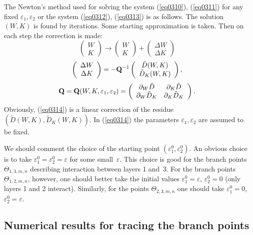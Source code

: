 \documentclass[12pt]{article}
\newcommand{\ptl}{\partial}
\newcommand{\eps}{\varepsilon}
\begin{document}
The Newton's method used for solving the system (\ref{eq0310}), (\ref{eq0311})
for any fixed $\eps_1 , \eps_2$
or the system (\ref{eq0312}), (\ref{eq0313}) is as follows. The solution $(W, K)$ is found
by iterations. 
Some starting approximation is taken.
Then on each step the correction is made:
\begin{equation}
\left( \begin{array}{c}
W\\
K
\end{array} \right) 
\to  
\left( \begin{array}{c}
W \\
K
\end{array} \right)
+
\left( \begin{array}{c}
\Delta W\\
\Delta K
\end{array} \right) 
\label{eq0314}
\end{equation} 
\begin{equation}
\left( \begin{array}{c}
\Delta W\\
\Delta K
\end{array} \right)
= 
-
{\bf Q}^{-1}
\left( \begin{array}{c}
\tilde D(W, K) \\
\tilde D_K(W, K)
\end{array} \right),
\label{eq0314}
\end{equation} 
\[
{\bf Q} = {\bf Q} (W,K,\eps_1 , \eps_2)= 
\left( \begin{array}{cc}
\ptl_W \tilde D   & \ptl_K \tilde D  \\
\ptl_W \tilde D_K & \ptl_K \tilde D_K  
\end{array}\right). 
\] 
Obviously, 
(\ref{eq0314}) is a linear correction of the residue $(\tilde D(W,K), \tilde D_K (W, K))$.
In (\ref{eq0314}) the parameters $\eps_1 , \eps_2$ are assumed to be fixed.

We should comment the choice of the starting point $(\eps_1^0 , \eps_2^0)$. 
An obvious choice is to take $\eps_1^0 = \eps_2^0 = \eps$ for some small~$\eps$. 
This choice is good for the branch points $\Theta_{1,3,m,n}$ describing interaction between layers 1 and~3. For the branch points $\Theta_{1,2,m,n}$, however,
one should better take the initial values $\eps_1^{0} = \eps$, $\eps_2^{0} = 0$ (only layers 1 and 2 interact). 
Similarly, for the points $\Theta_{2,3,m,n}$ one should take 
$\eps_1^{0} = 0 $, $\eps_2^{0} = \eps$.

\subsection{Numerical results for tracing the branch points}
\end{document}

